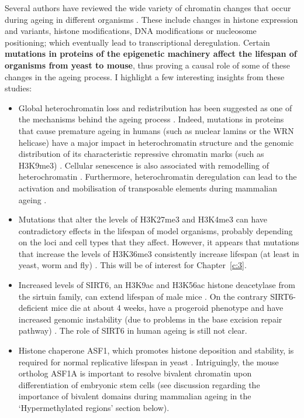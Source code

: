 \bigskip

Several authors have reviewed the wide variety of chromatin changes that occur during ageing in different organisms \cite{Benayoun2015a,Pal2016,Sen2016}. These include changes in histone expression and variants, histone modifications, DNA modifications or nucleosome positioning; which eventually lead to transcriptional deregulation. Certain \textbf{mutations in proteins of the epigenetic machinery affect the lifespan of organisms from yeast to mouse}, thus proving a causal role of some of these changes in the ageing process. I highlight a few interesting insights from these studies:

\begin{itemize}
	
	\item Global heterochromatin loss and redistribution has been suggested as one of the mechanisms behind the ageing process \cite{Villeponteau1997, Tsurumi2012}. Indeed, mutations in proteins that cause premature ageing in humans (such as nuclear lamins or the WRN helicase) have a major impact in heterochromatin structure and the genomic distribution of its characteristic repressive chromatin marks (such as H3K9me3) \cite{Zhang2015b}. Cellular senescence is also associated with remodelling of heterochromatin \cite{Zhang2007}. Furthermore, heterochromatin deregulation can lead to the activation and mobilisation of transposable elements during mammalian ageing \cite{DeCecco2013}. 
	
	\item Mutations that alter the levels of H3K27me3 and H3K4me3 can have contradictory effects in the lifespan of model organisms, probably depending on the loci and cell types that they affect. However, it appears that mutations that increase the levels of H3K36me3 consistently increase lifespan (at least in yeast, worm and fly) \cite{Benayoun2015a,Pal2016}. This will be of interest for Chapter~\ref{c:3}.
	
	\item Increased levels of SIRT6, an H3K9ac and H3K56ac histone deacetylase from the sirtuin family, can extend lifespan of male mice \cite{Kanfi2012}. On the contrary SIRT6-deficient mice die at about 4 weeks, have a progeroid phenotype  and have increased genomic instability (due to problems in the base excision repair pathway) \cite{Mostoslavsky2006}. The role of SIRT6 in human ageing is still not clear. 
	
	\item Histone chaperone ASF1, which promotes histone deposition and stability, is required for normal replicative lifespan in yeast \cite{Feser2010}. Intriguingly, the mouse ortholog ASF1A is important to resolve bivalent chromatin upon differentiation of embryonic stem cells \cite{Gao2018} (see discussion regarding the importance of bivalent domains during mammalian ageing in the `Hypermethylated regions' section below).
	
	
\end{itemize}

